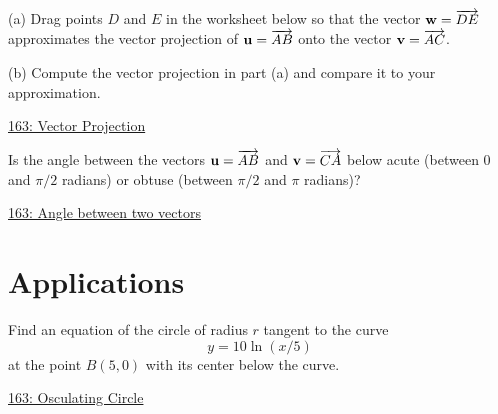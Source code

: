 \documentclass{ximera}
\begin{document}
\begin{question}  \label{Q3245r432dfg}
(a) Drag points $D$ and $E$ in the worksheet below so that the vector ${\bf w} = \overrightarrow{DE}$ approximates the vector projection of ${\bf u}=\overrightarrow{AB}$ onto the vector ${\bf v} =\overrightarrow{AC}$.

(b) Compute the vector projection in part (a) and compare it to  your approximation.


\begin{onlineOnly}
    \begin{center}
\end{center}
\end{onlineOnly}
 
\href{https://www.geogebra.org/classic/yfe3rqqw}{163: Vector Projection}
\end{question}


\begin{question} \label{Qder324324}
Is the angle between the vectors ${\bf u} = \overrightarrow{AB}$ and ${\bf v}=\overrightarrow{CA}$ below acute (between $0$ and $\pi/2$ radians) or obtuse (between $\pi/2$ and $\pi$ radians)?


\begin{onlineOnly}
    \begin{center}
\end{center}
\end{onlineOnly}
 
\href{https://www.geogebra.org/classic/fg56tgeq}{163: Angle between two vectors}
\end{question}



\section{Applications}

\begin{question} \label{Q98734454331}
Find an equation of the circle of radius $r$ tangent to the curve
\[
    y=10\ln (x/5)
\]
at the point $B(5,0)$ with its center below the curve.

 
\begin{onlineOnly}
    \begin{center}
\end{center}
\end{onlineOnly}
 
\href{https://www.geogebra.org/classic/fgvvdjaf}{163: Osculating Circle}
 
\end{question}
\end{document}
